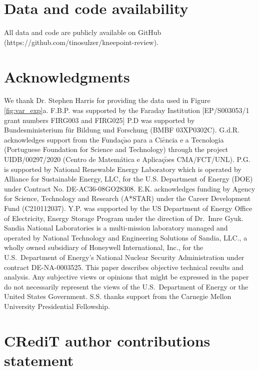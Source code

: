 \documentclass[journal=jpclcd,manuscript=article]{achemso}
\newcommand{\pbox}[1]{{
\fbox{
\parbox{0.8\textwidth}{  \fbox{$\triangleright$\textcolor{blue}{\textbf{Peter}:}} 
#1
}}}}
\begin{document}
\section{Data and code availability}

All data and code are publicly available on GitHub (https://github.com/tinosulzer/kneepoint-review).

\section{Acknowledgments}

We thank Dr. Stephen Harris for providing the data used in Figure \ref{fig:var_exp}a.
F.B.P. was supported by the Faraday Institution [EP/S003053/1 grant numbers FIRG003 and FIRG025]
P.D was supported by Bundesministerium für Bildung und Forschung (BMBF 03XP0302C).
G.d.R. acknowledges support from the {Funda{\c c}$\tilde{\text{a}}$o para a Ci$\hat{e}$ncia e a Tecnologia} (Portuguese Foundation for Science and Technology) through the project UIDB/00297/2020 (Centro de Matem\'atica e Aplica\c c$\tilde{\text{o}}$es CMA/FCT/UNL).
P.G. is supported by National Renewable Energy Laboratory which is operated by Alliance for Sustainable Energy, LLC, for the U.S. Department of Energy (DOE) under Contract No. DE-AC36-08GO28308. 
E.K. acknowledges funding by Agency for Science, Technology and Research (A*STAR) under the Career Development Fund (C210112037).
Y.P. was supported by the US Department of Energy Office of Electricity, Energy Storage Program under the direction of Dr.~Imre Gyuk. Sandia National Laboratories is a multi-mission laboratory managed and operated by National Technology and Engineering Solutions of Sandia, LLC., a wholly owned subsidiary of Honeywell International, Inc., for the U.S.~Department of Energy’s National Nuclear Security Administration under contract DE-NA-0003525.
This paper describes objective technical results and analysis. Any subjective views or opinions that might be expressed in the paper do not necessarily represent the views of the U.S.~Department of Energy or the United States Government.
S.S. thanks support from the Carnegie Mellon University Presidential Fellowship.

\section{CRediT author contributions statement}
\end{document}
